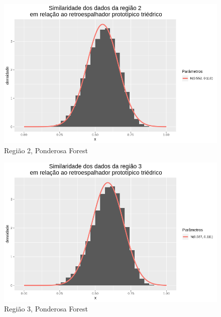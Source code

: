 \documentclass[12pt]{article}
\begin{document}
\begin{figure}[!h]
    \centering
    \vspace{0.1\linewidth}
    \includegraphics[width = \linewidth]{../../Images/Report_18_12_20/ponder_tri_region2.png}
    \caption{Região 2, Ponderosa Forest}
    \label{fig:pond_tri_r2}
\end{figure}

\begin{figure}[!h]
    \centering
    \vspace{0.1\linewidth}
    \includegraphics[width = \linewidth]{../../Images/Report_18_12_20/ponder_tri_region3.png}
    \caption{Região 3, Ponderosa Forest}
    \label{fig:pond_tri_r3}
\end{figure}
\end{document}
